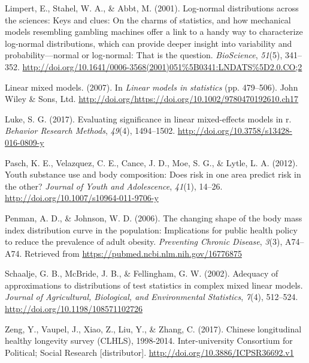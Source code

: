 \documentclass[12pt, twoside]{amherstthesis}
\begin{document}
\leavevmode\hypertarget{ref-limpert_log-normal_2001}{}%
Limpert, E., Stahel, W. A., \& Abbt, M. (2001). Log-normal distributions across the sciences: Keys and clues: On the charms of statistics, and how mechanical models resembling gambling machines offer a link to a handy way to characterize log-normal distributions, which can provide deeper insight into variability and probability---normal or log-normal: That is the question. \emph{BioScience}, \emph{51}(5), 341--352. \url{http://doi.org/10.1641/0006-3568(2001)051\%5B0341:LNDATS\%5D2.0.CO;2}

\leavevmode\hypertarget{ref-lme_instatistics}{}%
Linear mixed models. (2007). In \emph{Linear models in statistics} (pp. 479--506). John Wiley \& Sons, Ltd. \url{http://doi.org/https://doi.org/10.1002/9780470192610.ch17}

\leavevmode\hypertarget{ref-luke_evaluating_2017}{}%
Luke, S. G. (2017). Evaluating significance in linear mixed-effects models in r. \emph{Behavior Research Methods}, \emph{49}(4), 1494--1502. \url{http://doi.org/10.3758/s13428-016-0809-y}

\leavevmode\hypertarget{ref-pasch_youth_2012}{}%
Pasch, K. E., Velazquez, C. E., Cance, J. D., Moe, S. G., \& Lytle, L. A. (2012). Youth substance use and body composition: Does risk in one area predict risk in the other? \emph{Journal of Youth and Adolescence}, \emph{41}(1), 14--26. \url{http://doi.org/10.1007/s10964-011-9706-y}

\leavevmode\hypertarget{ref-penman_changing_2006}{}%
Penman, A. D., \& Johnson, W. D. (2006). The changing shape of the body mass index distribution curve in the population: Implications for public health policy to reduce the prevalence of adult obesity. \emph{Preventing Chronic Disease}, \emph{3}(3), A74--A74. Retrieved from \url{https://pubmed.ncbi.nlm.nih.gov/16776875}

\leavevmode\hypertarget{ref-schaalje_adequacy_2002}{}%
Schaalje, G. B., McBride, J. B., \& Fellingham, G. W. (2002). Adequacy of approximations to distributions of test statistics in complex mixed linear models. \emph{Journal of Agricultural, Biological, and Environmental Statistics}, \emph{7}(4), 512--524. \url{http://doi.org/10.1198/108571102726}

\leavevmode\hypertarget{ref-zeng_chinese_2017}{}%
Zeng, Y., Vaupel, J., Xiao, Z., Liu, Y., \& Zhang, C. (2017). Chinese longitudinal healthy longevity survey (CLHLS), 1998-2014. Inter-university Consortium for Political; Social Research {[}distributor{]}. \url{http://doi.org/10.3886/ICPSR36692.v1}

\end{document}
